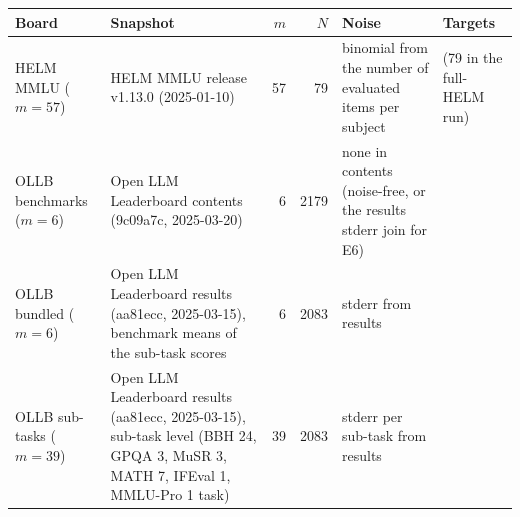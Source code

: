 \footnotesize\setlength{\tabcolsep}{3.5pt}
\begin{tabular}{@{}>{\raggedright\arraybackslash}p{1.1in}>{\raggedright\arraybackslash}p{1.65in}rr>{\raggedright\arraybackslash}p{1.05in}>{\raggedright\arraybackslash}p{0.62in}@{}}
\toprule
Board & Snapshot & $m$ & $N$ & Noise & Targets\\
\midrule
HELM MMLU ($m{=}57$) & HELM MMLU release v1.13.0 (2025-01-10) & 57 & 79 & binomial from the number of evaluated items per subject & 30 (79 in the full-HELM run)\\
OLLB benchmarks ($m{=}6$) & Open LLM Leaderboard contents (9c09a7c, 2025-03-20) & 6 & 2179 & none in contents (noise-free, or the results stderr join for E6) & 30\\
OLLB bundled ($m{=}6$) & Open LLM Leaderboard results (aa81ecc, 2025-03-15), benchmark means of the sub-task scores & 6 & 2083 & stderr from results & 30\\
OLLB sub-tasks ($m{=}39$) & Open LLM Leaderboard results (aa81ecc, 2025-03-15), sub-task level (BBH 24, GPQA 3, MuSR 3, MATH 7, IFEval 1, MMLU-Pro 1 task) & 39 & 2083 & stderr per sub-task from results & 30\\
\bottomrule
\end{tabular}
